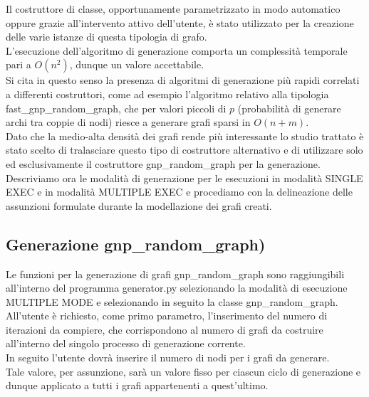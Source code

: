 Il costruttore di classe, opportunamente parametrizzato in modo automatico oppure grazie all'intervento attivo dell'utente, è stato utilizzato per la creazione delle varie istanze di questa tipologia di grafo.\\

L'esecuzione dell'algoritmo di generazione comporta un complessità temporale pari a \(O(n^2)\), dunque un valore accettabile.\\
Si cita in questo senso la presenza di algoritmi di generazione più rapidi correlati a differenti costruttori, come ad esempio l'algoritmo relativo alla tipologia fast\_gnp\_random\_graph, che per valori piccoli di $p$ (probabilità di generare archi tra coppie di nodi) riesce a generare grafi sparsi in \(O(n+m)\).\\

Dato che la medio-alta densità dei grafi rende più interessante lo studio trattato è stato scelto di tralasciare questo tipo di costruttore alternativo e di utilizzare solo ed esclusivamente il costruttore gnp\_random\_graph per la generazione.\\

Descriviamo ora le modalità di generazione per le esecuzioni in modalità SINGLE EXEC e in modalità MULTIPLE EXEC e procediamo con la delineazione delle assunzioni formulate durante la modellazione dei grafi creati.\\

\subsection{Generazione gnp\_random\_graph)}
\justify
Le funzioni per la generazione di grafi gnp\_random\_graph sono raggiungibili all'interno del programma generator.py selezionando la modalità di esecuzione MULTIPLE MODE e selezionando in seguito la classe gnp\_random\_graph.\\

All'utente è richiesto, come primo parametro, l'inserimento del numero di iterazioni da compiere, che corrispondono al numero di grafi da costruire all'interno del singolo processo di generazione corrente.\\

In seguito l'utente dovrà inserire il numero di nodi per i grafi da generare.\\
Tale valore, per assunzione, sarà un valore fisso per ciascun ciclo di generazione e dunque applicato a tutti i grafi appartenenti a quest'ultimo.\\


